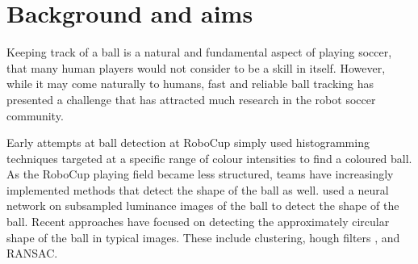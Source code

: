 \documentclass[11pt]{scrartcl}
\begin{document}
	\section{Background and aims} {




  		Keeping track of a ball is a natural and fundamental aspect of playing 
  		soccer, that many human players would not consider to be a skill in itself. 
  		However, while it may come naturally to humans, fast and reliable ball
        tracking has presented a challenge that has attracted much research in
        the robot soccer community.
        

        Early attempts at ball detection at RoboCup simply used histogramming
        techniques targeted at a specific range of colour intensities to find
        a coloured ball. As the RoboCup playing field became less structured,
        teams have increasingly implemented methods that detect the shape of
        the ball as well.
        \citet{schulz2007ball} used a neural network on
        subsampled luminance images of the ball to detect the shape of the 
        ball. Recent approaches have focused on detecting the approximately
        circular shape of the ball in typical images. These include
        clustering, hough filters \citet{li2013survey}, and RANSAC.

}
\end{document}

